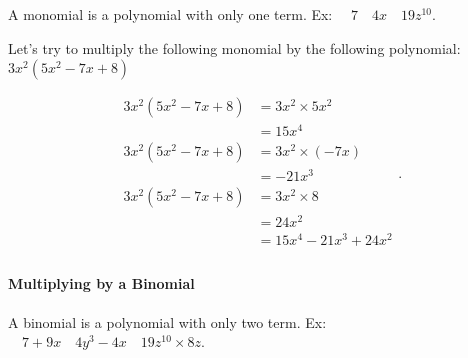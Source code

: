 \begin{definition}[Monomial]
  \label{def:monomial}

  A monomial is a polynomial with only one term. Ex:
  $\quad 7 \quad 4x \quad 19z^{10}$.
\end{definition}

\begin{example}
  \label{exm:multiplying_by_a_monomial}

  Let's try to multiply the following monomial by the following polynomial:
  $3x^{2}(5x^{2} - 7x + 8)$
  
  \begin{equation}
    \label{eqt:multiplying_by_a_monomial}
    \begin{split}
      3x^{2}(5x^{2} - 7x + 8) &= 3x^{2} \times 5x^{2} \\
                        &= 15x^{4} \\
      3x^{2}(5x^{2} - 7x + 8) &= 3x^{2} \times (-7x) \\
                        &= -21x^{3} \\
      3x^{2}(5x^{2} - 7x + 8) &= 3x^{2} \times 8 \\
                        &= 24x^{2} \\
                        &= \boxed{15x^{4} - 21x^{3} + 24x^{2}} \\
    \end{split}
  .\end{equation}
\end{example}


\paragraph{Multiplying by a Binomial}
\label{par:multiplying_by_a_binomial}

\begin{definition}[Binomial]
  \label{def:monomial}

  A binomial is a polynomial with only two term. Ex:
  $\quad 7 + 9x \quad 4y^{3} - 4x \quad 19z^{10} \times 8z$.
\end{definition}

